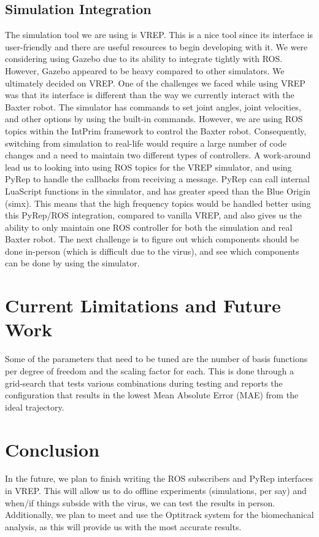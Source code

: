 \documentclass[letterpaper, 10 pt, conference]{ieeeconf}  %
\begin{document}
\subsection{Simulation Integration} 
The simulation tool we are using is VREP. This is a nice tool since its interface is user-friendly and there are useful resources to begin developing with it. We were considering using Gazebo due to its ability to integrate tightly with ROS. However, Gazebo appeared to be heavy compared to other simulators. We ultimately decided on VREP. 
\newline
\indent
One of the challenges we faced while using VREP was that its interface is different than the way we currently interact with the Baxter robot. The simulator has commands to set joint angles, joint velocities, and other options by using the built-in commands. However, we are using ROS topics within the IntPrim framework to control the Baxter robot. Consequently, switching from simulation to real-life would require a large number of code changes and a need to maintain two different types of controllers. 
\newline
\indent A work-around lead us to looking into using ROS topics for the VREP simulator, and using PyRep to handle the callbacks from receiving a message. PyRep can call internal LuaScript functions in the simulator, and has greater speed than the Blue Origin (simx). This means that the high frequency topics would be handled better using this PyRep/ROS integration, compared to vanilla VREP, and also gives us the ability to only maintain one ROS controller for both the simulation and real Baxter robot. The next challenge is to figure out which components should be done in-person (which is difficult due to the virus), and see which components can be done by using the simulator. 


\section{Current Limitations and Future Work}
Some of the parameters that need to be tuned are the number of basis functions per degree of freedom and the scaling factor for each. This is done through a grid-search that tests various combinations during testing and reports the configuration that results in the lowest Mean Absolute Error (MAE) from the ideal trajectory.

\section{Conclusion}
In the future, we plan to finish writing the ROS subscribers and PyRep interfaces in VREP. This will allow us to do offline experiments (simulations, per say) and when/if things subside with the virus, we can test the results in person. Additionally, we plan to meet and use the Optitrack system for the biomechanical analysis, as this will provide us with the most accurate results.
\end{document}
